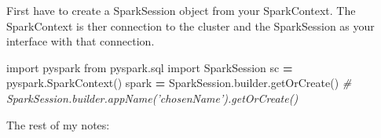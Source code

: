 \documentclass[]{book}
\newenvironment{Shaded}{\begin{snugshade}}{\end{snugshade}}
\newcommand{\ImportTok}[1]{#1}
\newcommand{\CommentTok}[1]{\textcolor[rgb]{0.56,0.35,0.01}{\textit{#1}}}
\newcommand{\OperatorTok}[1]{\textcolor[rgb]{0.81,0.36,0.00}{\textbf{#1}}}
\newcommand{\NormalTok}[1]{#1}
\theoremstyle{definition}
\theoremstyle{definition}
\theoremstyle{definition}
\theoremstyle{remark}
\begin{document}
First have to create a SparkSession object from your SparkContext. The
SparkContext is ther connection to the cluster and the SparkSession as
your interface with that connection.

\begin{Shaded}
\begin{Highlighting}[]
\ImportTok{import}\NormalTok{ pyspark}
\ImportTok{from}\NormalTok{ pyspark.sql }\ImportTok{import}\NormalTok{ SparkSession}
\NormalTok{sc }\OperatorTok{=}\NormalTok{ pyspark.SparkContext()}
\NormalTok{spark }\OperatorTok{=}\NormalTok{ SparkSession.builder.getOrCreate() }\CommentTok{# SparkSession.builder.appName('chosenName').getOrCreate()}
\end{Highlighting}
\end{Shaded}

The rest of my notes:
\end{document}
